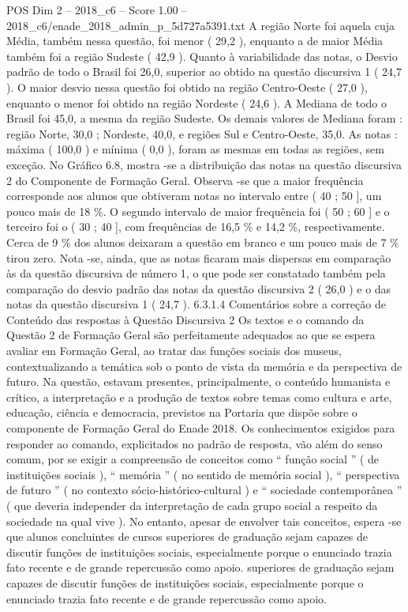 \begin{textsample}{POS Dim 2 – 2018\_c6 – Score 1.00 – 2018\_c6/enade\_2018\_admin\_p\_5d727a5391.txt}
A região Norte foi aquela cuja Média, também nessa questão, foi menor ( 29,2 ), enquanto a de maior Média também foi a região Sudeste ( 42,9 ).
Quanto à variabilidade das notas, o Desvio padrão de todo o Brasil foi 26,0, superior ao obtido na questão discursiva 1 ( 24,7 ).
O maior desvio nessa questão foi obtido na região Centro-Oeste ( 27,0 ), enquanto o menor foi obtido na região Nordeste ( 24,6 ).
A Mediana de todo o Brasil foi 45,0, a mesma da região Sudeste.
Os demais valores de Mediana foram : região Norte, 30,0 ; Nordeste, 40,0, e regiões Sul e Centro-Oeste, 35,0.
As notas : máxima ( 100,0 ) e mínima ( 0,0 ), foram as mesmas em todas as regiões, sem exceção.
No Gráfico 6.8, mostra -se a distribuição das notas na questão discursiva 2 do Componente de Formação Geral.
Observa -se que a maior frequência corresponde aos alunos que obtiveram notas no intervalo entre ( 40 ; 50 ], um pouco mais de 18 \%.
O segundo intervalo de maior frequência foi ( 50 ; 60 ] e o terceiro foi o ( 30 ; 40 ], com frequências de 16,5 \% e 14,2 \%, respectivamente.
Cerca de 9 \% dos alunos deixaram a questão em branco e um pouco mais de 7 \% tirou zero.
Nota -se, ainda, que as notas ficaram mais dispersas em comparação às da questão discursiva de número 1, o que pode ser constatado também pela comparação do desvio padrão das notas da questão discursiva 2 ( 26,0 ) e o das notas da questão discursiva 1 ( 24,7 ). 6.3.1.4 Comentários sobre a correção de Conteúdo das respostas à Questão Discursiva 2 Os textos e o comando da Questão 2 de Formação Geral são perfeitamente adequados ao que se espera avaliar em Formação Geral, ao tratar das funções sociais dos museus, contextualizando a temática sob o ponto de vista da memória e da perspectiva de futuro.
Na questão, estavam presentes, principalmente, o conteúdo humanista e crítico, a interpretação e a produção de textos sobre temas como cultura e arte, educação, ciência e democracia, previstos na Portaria que dispõe sobre o componente de Formação Geral do Enade 2018.
Os conhecimentos exigidos para responder ao comando, explicitados no padrão de resposta, vão além do senso comum, por se exigir a compreensão de conceitos como “ função social ” ( de instituições sociais ), “ memória ” ( no sentido de memória social ), “ perspectiva de futuro ” ( no contexto sócio-histórico-cultural ) e “ sociedade contemporânea ” ( que deveria independer da interpretação de cada grupo social a respeito da sociedade na qual vive ).
No entanto, apesar de envolver tais conceitos, espera -se que alunos concluintes de cursos superiores de graduação sejam capazes de discutir funções de instituições sociais, especialmente porque o enunciado trazia fato recente e de grande repercussão como apoio. superiores de graduação sejam capazes de discutir funções de instituições sociais, especialmente porque o enunciado trazia fato recente e de grande repercussão como apoio.

\end{textsample}
